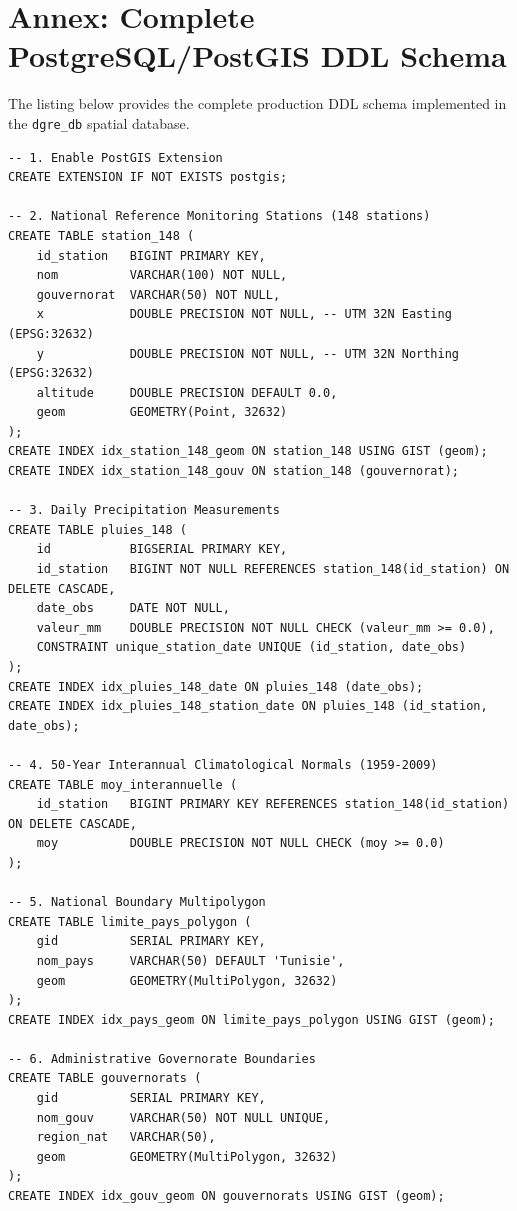 \documentclass[12pt,a4paper]{report}
\begin{document}
\newpage

\appendix

\chapter{Annex: Complete PostgreSQL/PostGIS DDL Schema}
\label{appendix:schema}

The listing below provides the complete production DDL schema implemented in the \texttt{dgre\_db} spatial database.

\begin{lstlisting}[style=sqlstyle, caption={Complete Data Definition Language (DDL) of the dgre\_db spatial database}]
-- 1. Enable PostGIS Extension
CREATE EXTENSION IF NOT EXISTS postgis;

-- 2. National Reference Monitoring Stations (148 stations)
CREATE TABLE station_148 (
    id_station   BIGINT PRIMARY KEY,
    nom          VARCHAR(100) NOT NULL,
    gouvernorat  VARCHAR(50) NOT NULL,
    x            DOUBLE PRECISION NOT NULL, -- UTM 32N Easting (EPSG:32632)
    y            DOUBLE PRECISION NOT NULL, -- UTM 32N Northing (EPSG:32632)
    altitude     DOUBLE PRECISION DEFAULT 0.0,
    geom         GEOMETRY(Point, 32632)
);
CREATE INDEX idx_station_148_geom ON station_148 USING GIST (geom);
CREATE INDEX idx_station_148_gouv ON station_148 (gouvernorat);

-- 3. Daily Precipitation Measurements
CREATE TABLE pluies_148 (
    id           BIGSERIAL PRIMARY KEY,
    id_station   BIGINT NOT NULL REFERENCES station_148(id_station) ON DELETE CASCADE,
    date_obs     DATE NOT NULL,
    valeur_mm    DOUBLE PRECISION NOT NULL CHECK (valeur_mm >= 0.0),
    CONSTRAINT unique_station_date UNIQUE (id_station, date_obs)
);
CREATE INDEX idx_pluies_148_date ON pluies_148 (date_obs);
CREATE INDEX idx_pluies_148_station_date ON pluies_148 (id_station, date_obs);

-- 4. 50-Year Interannual Climatological Normals (1959-2009)
CREATE TABLE moy_interannuelle (
    id_station   BIGINT PRIMARY KEY REFERENCES station_148(id_station) ON DELETE CASCADE,
    moy          DOUBLE PRECISION NOT NULL CHECK (moy >= 0.0)
);

-- 5. National Boundary Multipolygon
CREATE TABLE limite_pays_polygon (
    gid          SERIAL PRIMARY KEY,
    nom_pays     VARCHAR(50) DEFAULT 'Tunisie',
    geom         GEOMETRY(MultiPolygon, 32632)
);
CREATE INDEX idx_pays_geom ON limite_pays_polygon USING GIST (geom);

-- 6. Administrative Governorate Boundaries
CREATE TABLE gouvernorats (
    gid          SERIAL PRIMARY KEY,
    nom_gouv     VARCHAR(50) NOT NULL UNIQUE,
    region_nat   VARCHAR(50),
    geom         GEOMETRY(MultiPolygon, 32632)
);
CREATE INDEX idx_gouv_geom ON gouvernorats USING GIST (geom);
\end{lstlisting}
\end{document}
